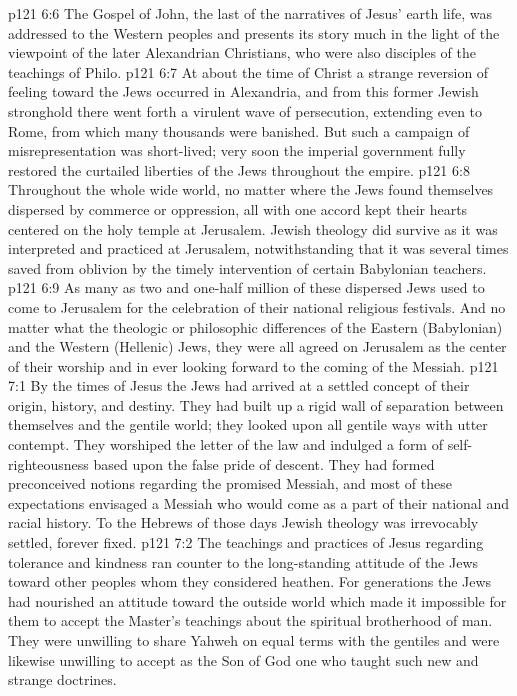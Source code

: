 \vs p121 6:6 The Gospel of John, the last of the narratives of Jesus’ earth life, was addressed to the Western peoples and presents its story much in the light of the viewpoint of the later Alexandrian Christians, who were also disciples of the teachings of Philo.
\pc \vs p121 6:7 At about the time of Christ a strange reversion of feeling toward the Jews occurred in Alexandria, and from this former Jewish stronghold there went forth a virulent wave of persecution, extending even to Rome, from which many thousands were banished. But such a campaign of misrepresentation was short\hyp{}lived; very soon the imperial government fully restored the curtailed liberties of the Jews throughout the empire.
\vs p121 6:8 Throughout the whole wide world, no matter where the Jews found themselves dispersed by commerce or oppression, all with one accord kept their hearts centered on the holy temple at Jerusalem. Jewish theology did survive as it was interpreted and practiced at Jerusalem, notwithstanding that it was several times saved from oblivion by the timely intervention of certain Babylonian teachers.\plusone
\vs p121 6:9 As many as two and one\hyp{}half million of these dispersed Jews used to come to Jerusalem for the celebration of their national religious festivals. And no matter what the theologic or philosophic differences of the Eastern (Babylonian) and the Western (Hellenic) Jews, they were all agreed on Jerusalem as the center of their worship and in ever looking forward to the coming of the Messiah.
\vs p121 7:1 By the times of Jesus the Jews had arrived at a settled concept of their origin, history, and destiny. They had built up a rigid wall of separation between themselves and the gentile world; they looked upon all gentile ways with utter contempt. They worshiped the letter of the law and indulged a form of self\hyp{}righteousness based upon the false pride of descent. They had formed preconceived notions regarding the promised Messiah, and most of these expectations envisaged a Messiah who would come as a part of their national and racial history. To the Hebrews of those days Jewish theology was irrevocably settled, forever fixed.
\vs p121 7:2 The teachings and practices of Jesus regarding tolerance and kindness ran counter to the long\hyp{}standing attitude of the Jews toward other peoples whom they considered heathen. For generations the Jews had nourished an attitude toward the outside world which made it impossible for them to accept the Master’s teachings about the spiritual brotherhood of man. They were unwilling to share Yahweh on equal terms with the gentiles and were likewise unwilling to accept as the Son of God one who taught such new and strange doctrines.
